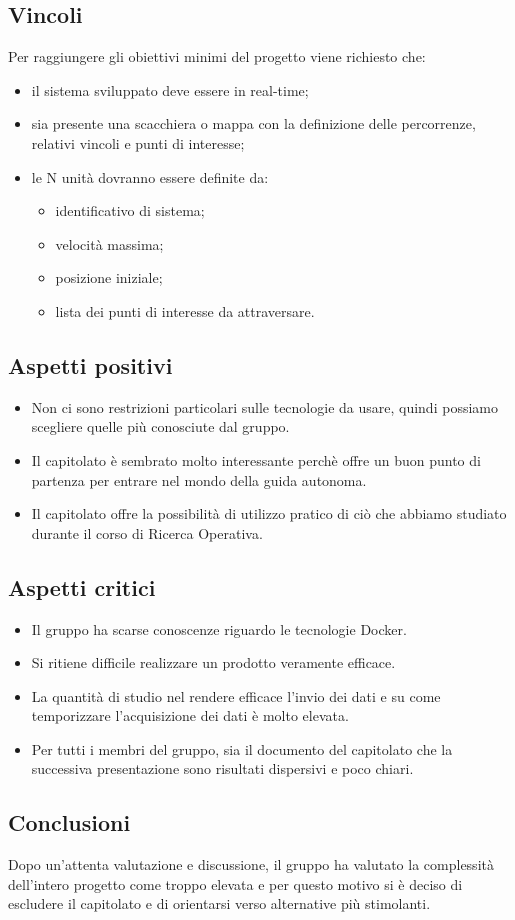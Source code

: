 \subsection{Vincoli}
Per raggiungere gli obiettivi minimi del progetto viene richiesto che:
\begin{itemize}
\item il sistema sviluppato deve essere in real-time;
\item sia presente una scacchiera o mappa con la definizione delle percorrenze, relativi vincoli e punti di interesse;
\item le N unità dovranno essere definite da:
	\begin{itemize}
	\item identificativo di sistema;
	\item velocità massima;
	\item posizione iniziale;
	\item lista dei punti di interesse da attraversare.
	\end{itemize}
\end{itemize}

\subsection{Aspetti positivi}
\begin{itemize}
	\item Non ci sono restrizioni particolari sulle tecnologie da usare, quindi possiamo scegliere quelle più conosciute dal gruppo.
	\item Il capitolato è sembrato molto interessante perchè offre un buon punto di partenza per entrare nel mondo della guida autonoma.
	\item Il capitolato offre la possibilità di utilizzo pratico di ciò che abbiamo studiato durante il corso di Ricerca Operativa.
\end{itemize}

\subsection{Aspetti critici}
\begin{itemize}
	\item Il gruppo ha scarse conoscenze riguardo le tecnologie Docker.
	\item Si ritiene difficile realizzare un prodotto veramente efficace.
	\item La quantità di studio nel rendere efficace l'invio dei dati e su come temporizzare l'acquisizione dei dati è molto elevata.
	\item Per tutti i membri del gruppo, sia il documento del capitolato che la successiva presentazione sono risultati dispersivi e poco chiari. 
\end{itemize}

\subsection{Conclusioni}
Dopo un'attenta valutazione e discussione, il gruppo ha valutato la complessità dell'intero progetto come troppo elevata e per questo motivo si è deciso di escludere il capitolato e di orientarsi verso alternative più stimolanti.